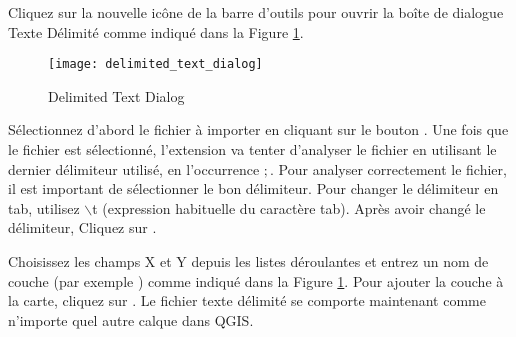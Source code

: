 Cliquez sur la nouvelle ic\^one de la barre d'outils  pour ouvrir la bo\^ite de dialogue Texte D\'elimit\'e comme indiqu\'e dans la Figure 
\ref{fig:delim_text_plugin_dialog}.

\begin{figure}[ht]
   \begin{center}
   \caption{Delimited Text Dialog \nixcaption}\label{fig:delim_text_plugin_dialog}\smallskip
   \texttt{[image: delimited\_text\_dialog]}
   \end{center}  
\end{figure}

S\'electionnez d'abord le fichier  \`a importer en cliquant
sur le bouton . Une fois que le fichier est s\'electionn\'e, l'extension va tenter d'analyser le fichier
en utilisant le dernier d\'elimiteur utilis\'e, en l'occurrence \mbox{$;$}. Pour analyser correctement le fichier, il 
est important de s\'electionner le bon d\'elimiteur. Pour changer le d\'elimiteur en tab, 
utilisez \mbox{$\backslash$}t (expression habituelle du caract\`ere tab).
Apr\`es avoir chang\'e le d\'elimiteur, Cliquez sur .

Choisissez les champs X et Y depuis les listes d\'eroulantes et entrez un nom de couche (par exemple ) comme indiqu\'e dans la Figure \ref{fig:delim_text_plugin_dialog}. Pour ajouter la couche \`a la carte, cliquez sur . Le fichier texte d\'elimit\'e se comporte maintenant comme n'importe quel autre calque dans QGIS.

